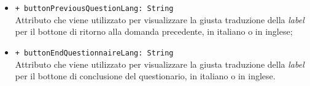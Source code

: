 \begin{itemize}
\begin{itemize}
			\item \texttt{+ buttonPreviousQuestionLang: String} \\ Attributo che viene utilizzato per visualizzare la giusta traduzione della \textit{label} per il bottone di ritorno alla domanda precedente, in italiano o in inglese;
			\item \texttt{+ buttonEndQuestionnaireLang: String} \\ Attributo che viene utilizzato per visualizzare la giusta traduzione della \textit{label} per il bottone di conclusione del questionario, in italiano o in inglese. 
		\end{itemize}
\end{itemize}